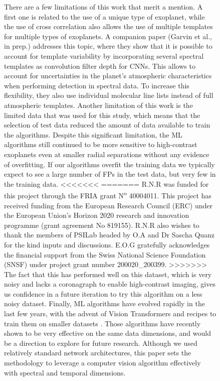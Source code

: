 \documentclass{aa}
\begin{document}
{{{\begin{figure}
{There are a few limitations of this work that merit a mention.
A first one is related to the use of a unique type of exoplanet, while the use of cross correlation also allows the use of multiple templates for multiple types of exoplanets.
A companion paper (Garvin et al., in prep.) addresses this topic, where they show that it is possible to account for template variability by incorporating several spectral templates as convolution filter depth for CNNs. 
This allows to account for uncertainties in the planet's atmospheric characteristics when performing detection in spectral data.
To increase this flexibility, they also use individual molecular line lists instead of full atmospheric templates.
Another limitation of this work is the limited data that was used for this study, which means that the selection of test data reduced the amount of data available to train the algorithms.
Despite this significant limitation, the ML algorithms still continued to be more sensitive to high-contrast exoplanets even at smaller radial separations without any evidence of overfitting.
If our algorithms overfit the training data we typically expect to see a large number of FPs in the test data, but very few in the training data. 
<<<<<<<
=======
R.N.R was funded for this project through the FRIA grant N\textsuperscript{o}	40004011. This project has received funding from the European Research Council (ERC) under the European Union's Horizon 2020 research and innovation programme (grant agreement No 819155). R.N.R also wishes to thank the members of PSILab headed by O.A and Dr Sascha Quanz for the kind inputs and discussions. E.O.G gratefully acknowledges the financial support from the Swiss National Science Foundation (SNSF) under project grant number 200020\_200399.
>>>>>>>
The fact that this has performed well on this dataset, which is very noisy and lacks a coronagraph to enable high-contrast imaging, gives us confidence in a future iteration to try this algorithm on a less noisy dataset.
Finally, ML algorithms have evolved rapidly in the last few years, with the advent of Vision Transformers \citep{2020ViT} and recipes to train them on smaller datasets \citep[e.g.,][]{2022Gani}. Those algorithms have recently shown to be very effective on the same data dimensions, and would be a direction to explore for future research. Although we used relatively standard network architectures, this paper sets the methodology to leverage a computer vision algorithm effectively with spectral and temporal dimensions.


}
\end{figure}}}}
\end{document}
